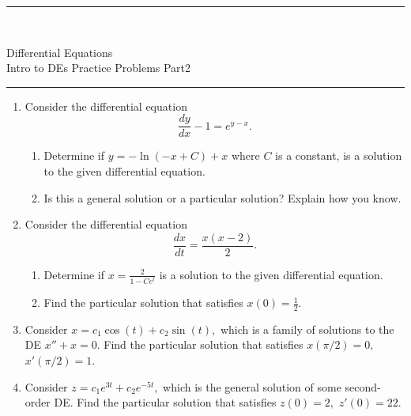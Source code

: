 \documentclass[12pt]{article}
\newcommand{\ben}{\begin{enumerate}}
\newcommand{\een}{\end{enumerate}}
\newcommand{\<}{\langle}
\renewcommand{\>}{\rangle}
\def\ds{\displaystyle}
\begin{document}
\noindent\rule{7in}{0.4pt}\\
\begin{center}
{\sc 
Differential Equations\\
Intro to DEs Practice Problems Part2	\\
}
\end{center}
\noindent\rule{7in}{0.4pt}



\ben
\item Consider the differential equation
		\[ \frac{dy}{dx} - 1 = e^{y - x}. \]
	
	\ben
	\item Determine if $\ds y = -\ln(-x+C) + x$ where $C$ is a constant, is a solution to the given
		differential equation.\\ \vfill

	\item Is this a general solution or a particular solution?  Explain how you know.\\
		\vspace{1in}
	\een
	
\newpage

\item Consider the differential equation
	\[ \frac{dx}{dt} = \frac{x(x-2)}{2}.\]  
	\ben
	\item Determine if $ \ds x = \frac{2}{1 - Ce^t}$ is a solution to the given
		differential equation.\\ \vfill

	\item Find the particular solution that satisfies $\ds x(0) = \frac{1}{2}.$\\ \vspace{2.5in}
	\een
	
\newpage

\item Consider $x = c_1\cos(t) + c_2 \sin(t),$ which is a family of
	solutions to the DE $x'' + x = 0.$  Find the particular solution that satisfies $x(\pi/2) = 0,$
	$x'(\pi/2) = 1.$\\ \vfill
	
\newpage	

\item Consider $z = c_1e^{3t} + c_2e^{-5t},$ which is the general solution of some second-order DE.
	Find the particular solution that satisfies $z(0) = 2,$
	$z'(0) = 22.$\\ \vfill

\een
\end{document}
